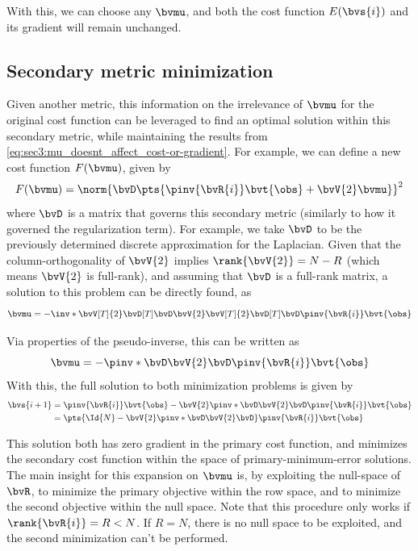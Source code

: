 {With this, we can choose any $\bvmu$, and both the cost function $E(\bvs{i})$ and its gradient will remain unchanged.

\subsection{Secondary metric minimization}

Given another metric, this information on the irrelevance of $\bvmu$ for the original cost function can be leveraged to find an optimal solution within this secondary metric, while maintaining the results from \cref{eq:sec3:mu_doesnt_affect_cost-or-gradient}. For example, we can define a new cost function $F(\bvmu)$, given by
\begin{equation}
	F(\bvmu) = \norm{\bvD \pts{\pinv{\bvR{i}} \bvt{\obs} + \bvV{2}\bvmu}}^2
	\label{eq:sec3:cost_function_mu}
\end{equation}
where $\bvD$ is a matrix that governs this secondary metric (similarly to how it governed the regularization term). For example, we take $\bvD$ to be the previously determined discrete approximation for the Laplacian. Given that the column-orthogonality of $\bvV{2}$ implies $\rank{\bvV{2}} = N-R$ (which means $\bvV{2}$ is full-rank), and assuming that $\bvD$ is a full-rank matrix, a solution to this problem can be directly found, as
\begin{equation}
	\bvmu = -\inv*{\bvV[T]{2} \bvD[T] \bvD\bvV{2}} \bvV[T]{2} \bvD[T] \bvD \pinv{\bvR{i}} \bvt{\obs}
\end{equation}

Via properties of the pseudo-inverse, this can be written as
\begin{equation}
	\bvmu = -\pinv*{\bvD \bvV{2}} \bvD \pinv{\bvR{i}} \bvt{\obs}
	\label{eq:sec2:definition_mu_full}
\end{equation}
With this, the full solution to both minimization problems is given by
\begin{equation}
	\begin{split}
		\bvs{i+1}
		& = \pinv{\bvR{i}} \bvt{\obs} - \bvV{2} \pinv*{\bvD \bvV{2}} \bvD \pinv{\bvR{i}} \bvt{\obs} \\
		& = \pts{\Id{N} - \bvV{2} \pinv*{\bvD \bvV{2}} \bvD} \pinv{\bvR{i}} \bvt{\obs}
	\end{split}
	\label{eq:sec2:definition_zi+1_with_mu}
\end{equation}

This solution both has zero gradient in the primary cost function, and minimizes the secondary cost function within the space of primary-minimum-error solutions. The main insight for this expansion on $\bvmu$ is, by exploiting the null-space of $\bvR$, to minimize the primary objective within the row space, and to minimize the second objective within the null space. Note that this procedure only works if $\rank{\bvR{i}} = R < N$. If $R = N$, there is no null space to be exploited, and the second minimization can't be performed.

}
